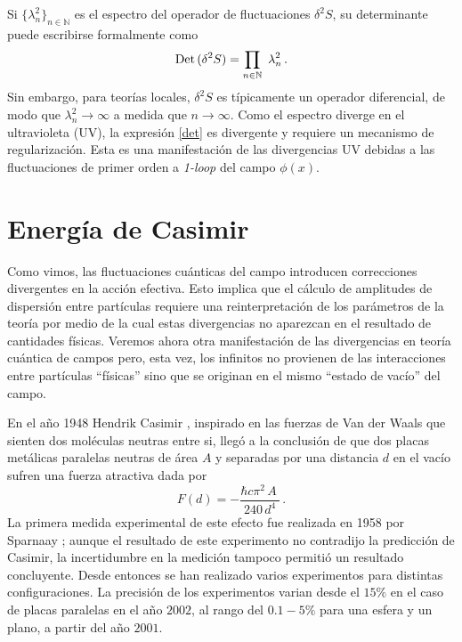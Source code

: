 Si $ \{ \lambda ^2 _n \} _{n \in \mathbb N}$ es el espectro del operador de fluctuaciones $ \delta ^2 S $, su determinante puede escribirse formalmente como
\begin{equation}\label{det}
{\rm Det}\,(\delta ^2 S) = \prod_{ n \in \mathbb N }\ \lambda ^2 _n\,.
\end{equation}
Sin embargo, para teorías locales, $\delta ^2 S$ es típicamente un operador diferencial, de modo que $\lambda ^2 _n\to\infty$ a medida que $n\to \infty$. Como el espectro diverge en el ultravioleta (UV), la expresión \eqref{det} es divergente y requiere un mecanismo de regularización. Esta es una manifestación de las divergencias UV debidas a las fluctuaciones de primer orden a {\it 1-loop} del campo $\phi (x)$.


\section{Energía de Casimir}\label{sec.casimir}

Como vimos, las fluctuaciones cuánticas del campo introducen correcciones divergentes en la acción efectiva. Esto implica que el cálculo de amplitudes de dispersión entre partículas requiere una reinterpretación de los parámetros de la teoría por medio de la cual estas divergencias no aparezcan en el resultado de cantidades físicas. Veremos ahora otra manifestación de las divergencias en teoría cuántica de campos pero, esta vez, los infinitos no provienen de las interacciones entre partículas ``físicas'' sino que se originan en el mismo ``estado de vacío'' del campo.


En el año 1948 Hendrik Casimir \cite{Casimir:1948dh}, inspirado en las fuerzas de Van der Waals que sienten dos moléculas neutras entre si, llegó a la conclusión de que dos placas metálicas paralelas neutras de área $A$ y separadas por una distancia $d$ en el vacío sufren una fuerza atractiva dada por
\begin{equation}
		F(d) = -  \frac{\hbar c \pi ^2 \,A\  }{240 \, d^4}\,.
	\label{casimir.1}
\end{equation}
La primera medida experimental de este efecto fue realizada en 1958 por Sparnaay \cite{SPARNAAY1958751}; aunque el resultado de este experimento no contradijo la predicción de Casimir, la incertidumbre en la medición tampoco permitió un resultado concluyente. Desde entonces se han realizado varios experimentos para distintas configuraciones. La precisión de los experimentos varian desde el $15 \%$ en el caso de placas paralelas \cite{casimir.placas.paralelas,articulo.casimir} en el año $2002$, al rango del $0.1-5 \%$ para una esfera y un plano, a partir del año $2001$\cite{casimir.cilindro1,PhysRevLett.81.4549,PhysRevD.60.111101,PhysRevA.62.052109}.

